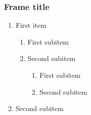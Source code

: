 \documentclass{beamer}
\begin{document}
\begin{frame}
\frametitle{Frame title}

\begin{enumerate}
\item First item 

\begin{enumerate}
\item First subitem
\item Second subitem

\begin{enumerate}
\item First subitem
\item Second subitem

\end{enumerate}
\end{enumerate}

\item Second subitem
\end{enumerate}
\end{frame}
\end{document}
